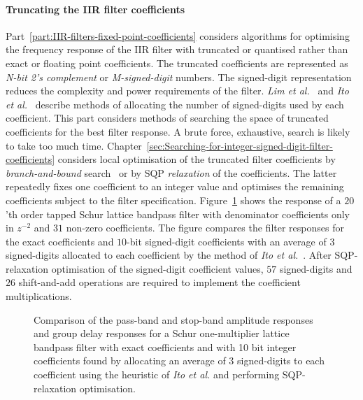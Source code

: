 \documentclass[a4paper,twoside,10pt,english]{report}
\begin{document}
\paragraph{Truncating the IIR filter coefficients}
Part~\ref{part:IIR-filters-fixed-point-coefficients} considers algorithms for
optimising the frequency response of the IIR filter with truncated or
quantised rather than exact or floating point coefficients. The truncated
coefficients are represented as \emph{N-bit 2's complement} or
\emph{M-signed-digit} numbers. The signed-digit representation reduces the
complexity and power requirements of the filter. \emph{Lim et
  al.}~\cite{Lim_SignedPowerOfTwoAllocationDigitalFilters} and \emph{Ito et
  al.}~\cite{Ito_PowersOfTwoAllocationFIR} describe methods of allocating the
number of signed-digits used by each coefficient. This part considers methods
of searching the space of truncated coefficients for the best filter
response. A brute force, exhaustive, search is likely to take too much
time. Chapter~\ref{sec:Searching-for-integer-signed-digit-filter-coefficients}
considers local optimisation of the truncated filter coefficients by
\emph{branch-and-bound}
search~\cite{LandDoig_AutomaticMethodSolvingDiscreteProgrammingProblems} or by
SQP \emph{relaxation} of the coefficients. The latter repeatedly fixes one
coefficient to an integer value and optimises the remaining coefficients
subject to the filter specification.
Figure~\ref{fig:sqp-relax-schurOneMlattice-bandpass-10-nbits-intro-response}
shows the response of a $20$'th order tapped Schur lattice bandpass filter
with denominator coefficients only in $z^{-2}$ and $31$ non-zero
coefficients. The figure compares the filter responses for the exact
coefficients and $10$-bit signed-digit coefficients with an average of $3$
signed-digits allocated to each coefficient by the method of \emph{Ito et
  al.}~\cite{Ito_PowersOfTwoAllocationFIR}. After SQP-relaxation optimisation
of the signed-digit coefficient values, $57$ signed-digits and $26$
shift-and-add operations are required to implement the coefficient
multiplications.
\begin{figure}[!htbp]
\begin{center}
\scalebox{0.7}{}
\caption{Comparison of the pass-band and stop-band amplitude responses and
  group delay responses for a Schur one-multiplier lattice bandpass filter
  with exact coefficients and with 10 bit integer coefficients found by
  allocating an average of 3 signed-digits to each coefficient using the
  heuristic of \emph{Ito et al.} and performing SQP-relaxation optimisation.}
\label{fig:sqp-relax-schurOneMlattice-bandpass-10-nbits-intro-response}
\end{center}
\end{figure}
\end{document}
